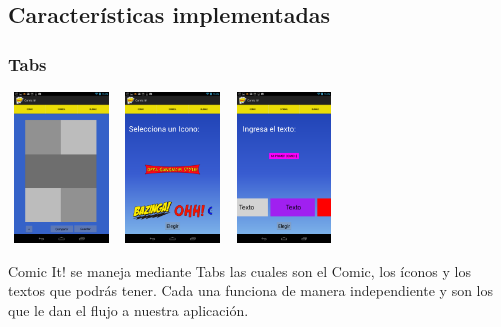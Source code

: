 \documentclass[utf8]{beamer}
\begin{document}
\subsection{Características implementadas}



\begin{frame}
  \frametitle{Tabs}
 

  	\begin{center}
		\begingroup
			\includegraphics[height=4cm,width=2.8205cm]{imagenes/plantilla.png}
			\hspace{1mm}
			\includegraphics[height=4cm,width=2.8205cm]{imagenes/iconos.png}
			\hspace{1mm}
			\includegraphics[height=4cm,width=2.8205cm]{imagenes/textos.png}
		\endgroup
	\end{center}

  \begin{block}{}
Comic It! se maneja mediante Tabs las cuales son el Comic, los íconos y los textos que podrás tener. Cada una funciona de manera independiente y son los que le dan el flujo a nuestra aplicación.
  \end{block}

\end{frame}
\end{document}
